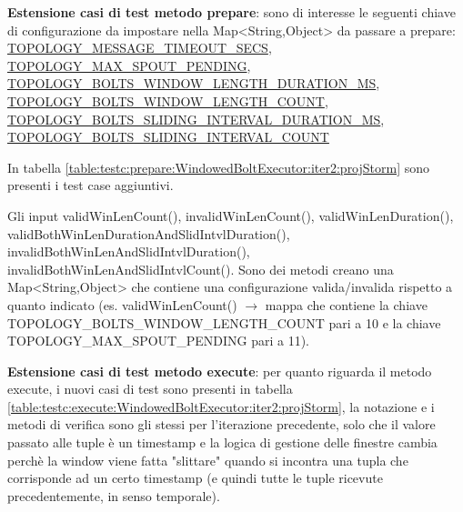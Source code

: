 \documentclass[10pt, a4paper]{article}
\newcommand{\gettablelabel}[5]{table:#1:#2:#3:iter#4:proj#5}
\def\storm{Storm}
\begin{document}
	\textbf{Estensione casi di test metodo prepare}: sono di interesse le seguenti chiave di configurazione da impostare
	nella Map<String,Object> da passare a prepare:
	\href{https://storm.apache.org/releases/2.6.2/javadocs/org/apache/storm/Config.html#TOPOLOGY_MESSAGE_TIMEOUT_SECS}
	{TOPOLOGY\_MESSAGE\_TIMEOUT\_SECS},
	\href{https://storm.apache.org/releases/2.6.2/javadocs/org/apache/storm/Config.html#TOPOLOGY_MAX_SPOUT_PENDING}
	{TOPOLOGY\_MAX\_SPOUT\_PENDING},
	\href{https://storm.apache.org/releases/2.6.2/javadocs/org/apache/storm/Config.html#TOPOLOGY_BOLTS_WINDOW_LENGTH_DURATION_MS}
	{TOPOLOGY\_BOLTS\_WINDOW\_LENGTH\_DURATION\_MS},
	\href{https://storm.apache.org/releases/2.6.2/javadocs/org/apache/storm/Config.html#TOPOLOGY_BOLTS_WINDOW_LENGTH_COUNT}
	{TOPOLOGY\_BOLTS\_WINDOW\_LENGTH\_COUNT},
	\href{https://storm.apache.org/releases/2.6.2/javadocs/org/apache/storm/Config.html#TOPOLOGY_BOLTS_SLIDING_INTERVAL_DURATION_MS}
	{TOPOLOGY\_BOLTS\_SLIDING\_INTERVAL\_DURATION\_MS},
	\href{https://storm.apache.org/releases/2.6.2/javadocs/org/apache/storm/Config.html#TOPOLOGY_BOLTS_SLIDING_INTERVAL_COUNT}
	{TOPOLOGY\_BOLTS\_SLIDING\_INTERVAL\_COUNT}
	
	In tabella \ref{\gettablelabel{testc}{prepare}{WindowedBoltExecutor}{2}{\storm}} sono presenti i test case aggiuntivi.
	
	Gli input validWinLenCount(), invalidWinLenCount(), validWinLenDuration(), validBothWinLenDurationAndSlidIntvlDuration(),
	invalidBothWinLenAndSlidIntvlDuration(), invalidBothWinLenAndSlidIntvlCount(). Sono dei metodi creano una Map<String,Object>
	che contiene una configurazione valida/invalida rispetto a quanto indicato (es. validWinLenCount() $\rightarrow$ mappa che
	contiene la chiave TOPOLOGY\_BOLTS\_WINDOW\_LENGTH\_COUNT pari a 10 e la chiave TOPOLOGY\_MAX\_SPOUT\_PENDING pari a 11).
	
	\textbf{Estensione casi di test metodo execute}: per quanto riguarda il metodo execute, i nuovi casi di test sono
	presenti in tabella \ref{\gettablelabel{testc}{execute}{WindowedBoltExecutor}{2}{\storm}}, la notazione e i metodi di verifica
	sono gli stessi per l'iterazione precedente, solo che il valore passato alle tuple è un timestamp e la logica di gestione
	delle finestre cambia perchè la window viene fatta "slittare" quando si incontra una tupla che corrisponde ad un certo
	timestamp (e quindi tutte le tuple ricevute precedentemente, in senso temporale).
		
\end{document}
